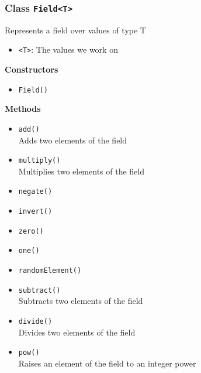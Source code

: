 \subsubsection{Class \lstinline|Field<T>|}
Represents a field over values of type T
\begin{itemize}
\item \lstinline|<T>|: The values we work on
\end{itemize}

\textbf{Constructors}
\begin{itemize}
\item \lstinline|Field()| \\


\end{itemize}

\textbf{Methods}
\begin{itemize}
\item \lstinline|add()| \\
Adds two elements of the field

\item \lstinline|multiply()| \\
Multiplies two elements of the field

\item \lstinline|negate()| \\


\item \lstinline|invert()| \\


\item \lstinline|zero()| \\


\item \lstinline|one()| \\


\item \lstinline|randomElement()| \\


\item \lstinline|subtract()| \\
Subtracts two elements of the field

\item \lstinline|divide()| \\
Divides two elements of the field

\item \lstinline|pow()| \\
Raises an element of the field to an integer power

\end{itemize}

